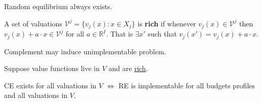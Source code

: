 \documentclass[11pt]{elegantbook}
\begin{document}
\begin{proposition}
    Random equilibrium always exists.
\end{proposition}

\begin{definition}[Rich]
    \normalfont
    A set of valuations $\mathcal{V}^j=\{v_j(x):x\in X_j\}$ is \textbf{rich} if whenever $v_j(x)\in \mathcal{V}^j$ then $v_j(x)+a\cdot x\in \mathcal{V}^j$ for all $a\in \mathbb{R}^I$. That is $\exists x'$ such that $v_j(x')=v_j(x)+a\cdot x$.
\end{definition}
Complement may induce unimplementable problem.

Suppose value functions live in $V$ and are \underline{rich}.
\begin{theorem}
    CE exists for all valuations in $V$ $\Leftrightarrow$ RE is implementable for all budgets profiles and all valuations in $V$.
\end{theorem}
\end{document}
